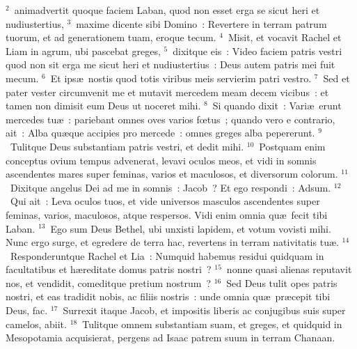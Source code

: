 ${}^{2}$~animadvertit quoque faciem Laban, quod non esset erga se sicut heri et nudiustertius,
${}^{3}$~maxime dicente sibi Domino~: Revertere in terram patrum tuorum, et ad generationem tuam, eroque tecum.
${}^{4}$~Misit, et vocavit Rachel et Liam in agrum, ubi pascebat greges,
${}^{5}$~dixitque eis~: Video faciem patris vestri quod non sit erga me sicut heri et nudiustertius~: Deus autem patris mei fuit mecum.
${}^{6}$~Et ips\ae\ nostis quod totis viribus meis servierim patri vestro.
${}^{7}$~Sed et pater vester circumvenit me et mutavit mercedem meam decem vicibus~: et tamen non dimisit eum Deus ut noceret mihi.
${}^{8}$~Si quando dixit~: Vari\ae\ erunt mercedes tu\ae~: pariebant omnes oves varios fœtus~; quando vero e contrario, ait~: Alba qu\ae que accipies pro mercede~: omnes greges alba pepererunt.
${}^{9}$~Tulitque Deus substantiam patris vestri, et dedit mihi.
${}^{10}$~Postquam enim conceptus ovium tempus advenerat, levavi oculos meos, et vidi in somnis ascendentes mares super feminas, varios et maculosos, et diversorum colorum.
${}^{11}$~Dixitque angelus Dei ad me in somnis~: Jacob~? Et ego respondi~: Adsum.
${}^{12}$~Qui ait~: Leva oculos tuos, et vide universos masculos ascendentes super feminas, varios, maculosos, atque respersos. Vidi enim omnia qu\ae\ fecit tibi Laban.
${}^{13}$~Ego sum Deus Bethel, ubi unxisti lapidem, et votum vovisti mihi. Nunc ergo surge, et egredere de terra hac, revertens in terram nativitatis tu\ae .
${}^{14}$~Responderuntque Rachel et Lia~: Numquid habemus residui quidquam in facultatibus et h\ae reditate domus patris nostri~?
${}^{15}$~nonne quasi alienas reputavit nos, et vendidit, comeditque pretium nostrum~?
${}^{16}$~Sed Deus tulit opes patris nostri, et eas tradidit nobis, ac filiis nostris~: unde omnia qu\ae\ pr\ae cepit tibi Deus, fac.
${}^{17}$~Surrexit itaque Jacob, et impositis liberis ac conjugibus suis super camelos, abiit.
${}^{18}$~Tulitque omnem substantiam suam, et greges, et quidquid in Mesopotamia acquisierat, pergens ad Isaac patrem suum in terram Chanaan.



